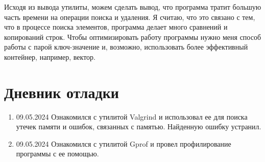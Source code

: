 Исходя из вывода утилиты, можем сделать вывод, что программа тратит большую часть времени на операции поиска и удаления. 
Я считаю, что это связано с тем, что в процессе поиска элементов, программа делает много сравнений и копирований строк. 
Чтобы оптимизировать работу программы нужно меня способ работы с парой ключ-значение и, возможно, 
использовать более эффективный контейнер, например, вектор.
\pagebreak

\section{Дневник отладки}
\begin{enumerate}
    \item 09.05.2024 Ознакомился с утилитой Valgrind и использовал ее для поиска утечек памяти и ошибок, связанных с памятью. Найденную ошибку устранил.
    \item 09.05.2024 Ознакомился с утилитой Gprof и провел профилирование программы с ее помощью.
\end{enumerate}
\pagebreak
